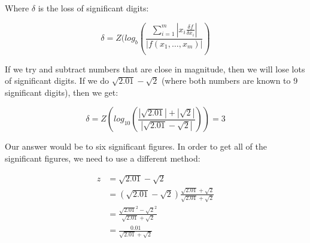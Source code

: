 Where $\delta$ is the loss of significant digits:

\[
  \delta = Z(log_b(
    \frac{
      \sum^m_{i=1}|x_i\frac{\delta f}{\delta x_i}|
    }{
      |f(x_1, \dots, x_m)|
    }
  )
\]


If we try and subtract numbers that are close in magnitude, then we will lose
lots of significant digits. If we do $\sqrt{2.01} - \sqrt{2}$ (where both
numbers are known to 9 significant digits), then we get:

\[
  \delta = Z(log_10(
    \frac{
      |\sqrt{2.01}| + |\sqrt{2}|
    }{
      |\sqrt{2.01} - \sqrt{2}|
    })) = 3
\]

Our answer would be to six significant figures. In order to get all of the
significant figures, we need to use a different method:

\[
  \begin{split}
    z &= \sqrt{2.01} - \sqrt{2}\\
      &= (\sqrt{2.01} - \sqrt{2})\frac{\sqrt{2.01}
         + \sqrt{2}}{\sqrt{2.01} + \sqrt{2}}\\
      &= \frac{\sqrt{2.01}^2 - \sqrt{2}^2}{\sqrt{2.01} + \sqrt{2}}\\
      &= \frac{0.01}{\sqrt{2.01} + \sqrt{2}}
  \end{split}
\]

